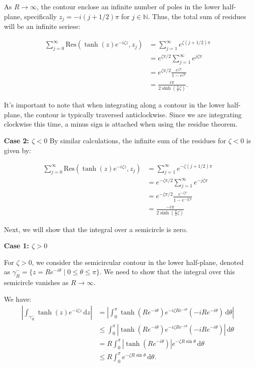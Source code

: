 \documentclass[a4paper,12pt]{article}
\newcommand{\Res}{\text{Res}}
\newcommand{\z}{\zeta}
\newcommand{\dd}{\mathrm{d}}
\begin{document}
As $R \to \infty$, the contour enclose an infinite number of poles in the lower half-plane, specifically $z_j = -i (j + 1/2)\pi$ for $j \in \mathbb{N}$. Thus, the total sum of residues will be an infinite seriese:

\begin{align*}
  \sum_{j=0}^{\infty} \Res(\tanh(z)e^{-i \z z}, z_j) &= \sum_{j=1}^{\infty} e^{\z (j + 1/2)\pi} \\
  &= e^{\z \pi/2} \sum_{j=1}^{\infty} e^{j\z \pi} \\
  &= e^{\z \pi/2} \frac{e^{\z \pi}}{1 - e^{\z \pi}}\\
  &=  \frac{i\pi}{2\sinh\left(\frac{\pi}{2} \z\right)}.
\end{align*}

It's important to note that when integrating along a contour in the lower half-plane, the contour is typically traversed anticlockwise.
Since we are integrating clockwise this time, a minus sign is attached when using the residue theorem.

\bigskip

\textbf{Case 2: $\zeta < 0$}
By similar calculations, the infinite sum of the residues for $\z < 0$ is given by:

\begin{align*}
  \sum_{j=0}^{\infty} \Res(\tanh(z)e^{-i \z z}, z_j) &= \sum_{j=1}^{\infty} e^{-\z (j + 1/2)\pi} \\
  &= e^{-\z \pi/2} \sum_{j=1}^{\infty} e^{-j\z \pi} \\
  &= e^{-\z \pi/2} \frac{e^{-\z \pi}}{1 - e^{-j\z \pi}}\\
  &= \frac{-i\pi}{2\sinh\left(\frac{\pi}{2} \z\right)}
\end{align*}

\bigskip

Next, we will show that the integral over a semicircle is zero.

\bigskip

\textbf{Case 1: $\zeta > 0$}

For $\z > 0$, we consider the semicircular contour in the lower half-plane, denoted as $\gamma^-_R = \{ z = R e^{-i\theta} \mid 0 \leq \theta \leq \pi \}$.
We need to show that the integral over this semicircle vanishes as $R \to \infty$.

We have:
\begin{align*}
  \left|\int_{\gamma^-_R} \tanh(z)e^{-i \z z} \, \dd z\right| &= \left| \int_{0}^{\pi} \tanh(R e^{-i\theta}) e^{-i \z R e^{-i\theta}} (-i R e^{-i\theta}) \, \dd\theta \right| \\
  &\leq \int_{0}^{\pi} \left| \tanh(R e^{-i\theta}) e^{-i \z R e^{-i\theta}} (-i R e^{-i\theta}) \right| \, \dd\theta \\
  &=  R \int_{0}^{\pi} \left| \tanh(R e^{-i\theta})  \right|e^{ -\z R \sin \theta} \, \dd\theta \\
  &\leq  R \int_{0}^{\pi} e^{ -\z R \sin \theta} \, \dd\theta.
\end{align*}
\end{document}
